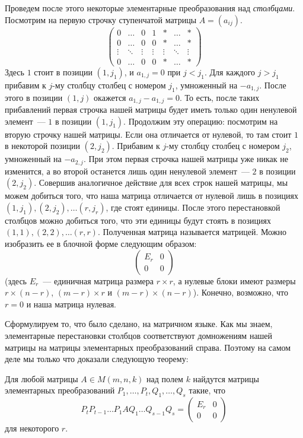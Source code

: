 Проведем после этого некоторые элементарные преобразования над
{\it столбцами}.
Посмотрим на первую строчку ступенчатой матрицы $A=(a_{ij})$.
$$
\begin{pmatrix}
0 & \dots & 0 & 1 & * & \dots & * \\
0 & \dots & 0 & 0 & * & \dots & * \\
\vdots & \ddots & \vdots & \vdots & \vdots & \ddots & \vdots \\
0 & \dots & 0 & 0 & * & \dots & * 
\end{pmatrix}
$$
Здесь $1$ стоит в позиции $(1,j_1)$, и $a_{1,j}=0$ при
$j<j_1$. Для каждого $j>j_1$ прибавим к $j$-му столбцу столбец с
номером $j_1$, умноженный на $-a_{1,j}$. После этого в позиции $(1,j)$
окажется $a_{1,j}-a_{1,j}=0$. То есть, после таких прибавлений первая
строчка нашей матрицы будет иметь только один ненулевой элемент~---
$1$ в позиции $(1,j_1)$.
Продолжим эту операцию: посмотрим на вторую строчку нашей
матрицы. Если она отличается от нулевой, то там стоит $1$ в некоторой
позиции $(2,j_2)$. Прибавим к $j$-му столбцу столбец с номером $j_2$,
умноженный на $-a_{2,j}$. При этом первая строчка нашей матрицы уже
никак не изменится, а во второй останется лишь один ненулевой
элемент~--- $2$ в позиции $(2,j_2)$. Совершив аналогичное действие для
всех строк нашей матрицы, мы можем добиться того, что наша матрица
отличается от нулевой лишь в позициях $(1,j_1), (2,j_2), \dots
(r,j_r)$, где стоят единицы. После этого перестановкой столбцов можно
добиться того, что эти единицы будут стоять в позициях $(1,1), (2,2),
\dots (r,r)$. Полученная матрица называется  матрицей. Можно изобразить ее в блочной форме следующим
образом:
$$
\left(\begin{matrix}
E_r & 0\\
0 & 0
\end{matrix}\right)
$$
(здесь $E_r$~--- единичная матрица размера $r\times r$, а нулевые
блоки имеют размеры $r\times (n-r)$, $(m-r)\times r$ и $(m-r)\times
(n-r)$). Конечно, возможно, что $r=0$ и наша матрица нулевая.

Сформулируем то, что было сделано, на матричном языке. Как мы знаем,
элементарные перестановки столбцов соответствуют домножениям нашей
матрицы на матрицы элементарных преобразований справа. Поэтому на
самом деле мы только что доказали следующую теорему:
\begin{theorem}\label{thm_pdq}
Для любой матрицы $A\in M(m,n,k)$ над полем $k$ найдутся матрицы
элементарных преобразований $P_1,\dots,P_t,Q_1,\dots,Q_s$ такие, что
$$
P_tP_{t-1}\dots P_1AQ_1\dots Q_{s-1}Q_s =
\begin{pmatrix}
E_r & 0\\
0 & 0
\end{pmatrix}
$$
для некоторого $r$.
\end{theorem}

